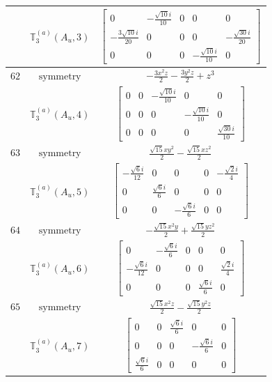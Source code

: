 \documentclass[fleqn,8pt,landscape]{jsarticle}
\begin{document}
\begin{longtable}{ccc}
$  $ & $ \mathbb{T}_{3}^{(a)}(A_{u},3) $ & $ \begin{bmatrix} 0 & - \frac{\sqrt{10} i}{10} & 0 & 0 & 0 \\ - \frac{3 \sqrt{10} i}{20} & 0 & 0 & 0 & - \frac{\sqrt{30} i}{20} \\ 0 & 0 & 0 & - \frac{\sqrt{10} i}{10} & 0 \end{bmatrix} $ \\ \hline
$ 62 $ & $ \text{symmetry} $ & $ - \frac{3 x^{2} z}{2} - \frac{3 y^{2} z}{2} + z^{3} $ \\
$  $ & $ \mathbb{T}_{3}^{(a)}(A_{u},4) $ & $ \begin{bmatrix} 0 & 0 & - \frac{\sqrt{10} i}{10} & 0 & 0 \\ 0 & 0 & 0 & - \frac{\sqrt{10} i}{10} & 0 \\ 0 & 0 & 0 & 0 & \frac{\sqrt{30} i}{10} \end{bmatrix} $ \\ \hline
$ 63 $ & $ \text{symmetry} $ & $ \frac{\sqrt{15} x y^{2}}{2} - \frac{\sqrt{15} x z^{2}}{2} $ \\
$  $ & $ \mathbb{T}_{3}^{(a)}(A_{u},5) $ & $ \begin{bmatrix} - \frac{\sqrt{6} i}{12} & 0 & 0 & 0 & - \frac{\sqrt{2} i}{4} \\ 0 & \frac{\sqrt{6} i}{6} & 0 & 0 & 0 \\ 0 & 0 & - \frac{\sqrt{6} i}{6} & 0 & 0 \end{bmatrix} $ \\ \hline
$ 64 $ & $ \text{symmetry} $ & $ - \frac{\sqrt{15} x^{2} y}{2} + \frac{\sqrt{15} y z^{2}}{2} $ \\
$  $ & $ \mathbb{T}_{3}^{(a)}(A_{u},6) $ & $ \begin{bmatrix} 0 & - \frac{\sqrt{6} i}{6} & 0 & 0 & 0 \\ - \frac{\sqrt{6} i}{12} & 0 & 0 & 0 & \frac{\sqrt{2} i}{4} \\ 0 & 0 & 0 & \frac{\sqrt{6} i}{6} & 0 \end{bmatrix} $ \\ \hline
$ 65 $ & $ \text{symmetry} $ & $ \frac{\sqrt{15} x^{2} z}{2} - \frac{\sqrt{15} y^{2} z}{2} $ \\
$  $ & $ \mathbb{T}_{3}^{(a)}(A_{u},7) $ & $ \begin{bmatrix} 0 & 0 & \frac{\sqrt{6} i}{6} & 0 & 0 \\ 0 & 0 & 0 & - \frac{\sqrt{6} i}{6} & 0 \\ \frac{\sqrt{6} i}{6} & 0 & 0 & 0 & 0 \end{bmatrix} $ \\ \hline

\end{longtable}
\end{document}
